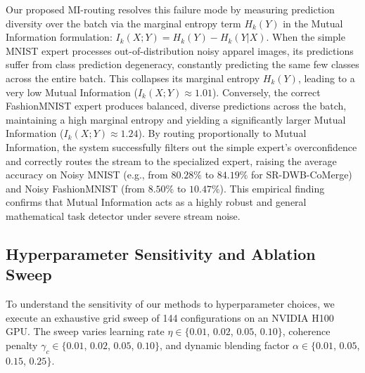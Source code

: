 \documentclass{article}
\theoremstyle{plain}
\theoremstyle{definition}
\theoremstyle{remark}
\begin{document}
Our proposed MI-routing resolves this failure mode by measuring prediction diversity over the batch via the marginal entropy term $H_k(Y)$ in the Mutual Information formulation: $I_k(X;Y) = H_k(Y) - H_k(Y|X)$. When the simple MNIST expert processes out-of-distribution noisy apparel images, its predictions suffer from class prediction degeneracy, constantly predicting the same few classes across the entire batch. This collapses its marginal entropy $H_k(Y)$, leading to a very low Mutual Information ($I_k(X;Y) \approx 1.01$). Conversely, the correct FashionMNIST expert produces balanced, diverse predictions across the batch, maintaining a high marginal entropy and yielding a significantly larger Mutual Information ($I_k(X;Y) \approx 1.24$). By routing proportionally to Mutual Information, the system successfully filters out the simple expert's overconfidence and correctly routes the stream to the specialized expert, raising the average accuracy on Noisy MNIST (e.g., from $80.28\%$ to $84.19\%$ for SR-DWB-CoMerge) and Noisy FashionMNIST (from $8.50\%$ to $10.47\%$). This empirical finding confirms that Mutual Information acts as a highly robust and general mathematical task detector under severe stream noise.

\subsection{Hyperparameter Sensitivity and Ablation Sweep}

To understand the sensitivity of our methods to hyperparameter choices, we execute an exhaustive grid sweep of 144 configurations on an NVIDIA H100 GPU. The sweep varies learning rate $\eta \in \{0.01$, $0.02$, $0.05$, $0.10\}$, coherence penalty $\gamma_c \in \{0.01$, $0.02$, $0.05$, $0.10\}$, and dynamic blending factor $\alpha \in \{0.01$, $0.05$, $0.15$, $0.25\}$.
\end{document}

